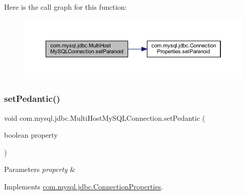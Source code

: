 Here is the call graph for this function\+:
\nopagebreak
\begin{figure}[H]
\begin{center}
\leavevmode
\includegraphics[width=350pt]{classcom_1_1mysql_1_1jdbc_1_1_multi_host_my_s_q_l_connection_a90febab2aa995ba6ef06ebaf57ffd087_cgraph}
\end{center}
\end{figure}
\mbox{\label{classcom_1_1mysql_1_1jdbc_1_1_multi_host_my_s_q_l_connection_a9e6d76a788879ee7f45d6407d89a63c0}} 
\subsubsection{\texorpdfstring{set\+Pedantic()}{setPedantic()}}
{\footnotesize\ttfamily void com.\+mysql.\+jdbc.\+Multi\+Host\+My\+S\+Q\+L\+Connection.\+set\+Pedantic (\begin{DoxyParamCaption}\item[{boolean}]{property }\end{DoxyParamCaption})}


\begin{DoxyParams}{Parameters}
{\em property} & \\
\hline
\end{DoxyParams}


Implements \mbox{\hyperlink{interfacecom_1_1mysql_1_1jdbc_1_1_connection_properties_acc7191665477c54523bc25845278b99f}{com.\+mysql.\+jdbc.\+Connection\+Properties}}.

